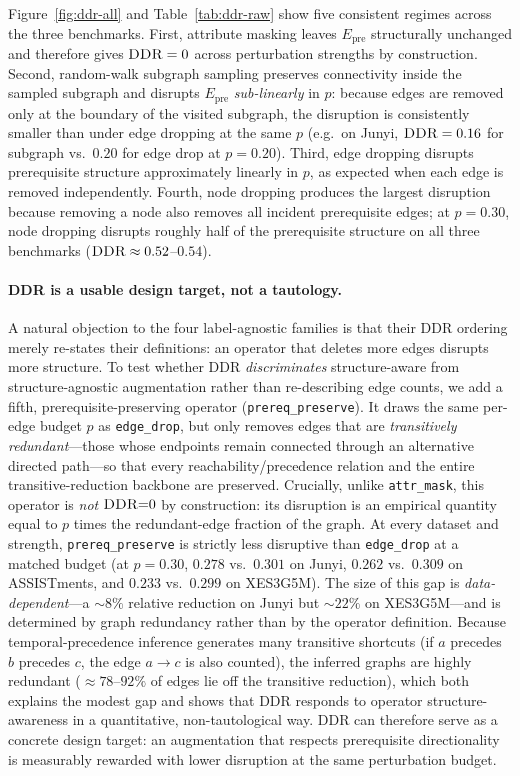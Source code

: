 \documentclass[pdflatex,sn-basic]{sn-jnl}
\newcommand{\Epre}{\ensuremath{E_{\text{pre}}}}
\newcommand{\DDR}{\textsc{DDR}}
\begin{document}
Figure~\ref{fig:ddr-all} and Table~\ref{tab:ddr-raw} show five
consistent regimes across the three benchmarks. First, attribute
masking leaves $\Epre$ structurally unchanged and therefore gives
$\DDR{}=0$ across perturbation strengths by construction. Second,
random-walk subgraph sampling preserves connectivity inside the
sampled subgraph and disrupts $\Epre$ \emph{sub-linearly} in $p$:
because edges are removed only at the boundary of the visited
subgraph, the disruption is consistently smaller than under
edge dropping at the same $p$ (e.g.\ on Junyi, $\DDR{} = 0.16$ for
subgraph vs.\ $0.20$ for edge drop at $p=0.20$). Third, edge dropping
disrupts prerequisite structure approximately linearly in $p$, as
expected when each edge is removed independently. Fourth, node
dropping produces the largest disruption because removing a node also
removes all incident prerequisite edges; at $p = 0.30$, node dropping
disrupts roughly half of the prerequisite structure on all three
benchmarks ($\DDR{} \approx 0.52$--$0.54$).

\paragraph{\DDR{} is a usable design target, not a tautology.}
A natural objection to the four label-agnostic families is that their
\DDR{} ordering merely re-states their definitions: an operator that
deletes more edges disrupts more structure. To test whether \DDR{}
\emph{discriminates} structure-aware from structure-agnostic
augmentation rather than re-describing edge counts, we add a fifth,
prerequisite-preserving operator (\texttt{prereq\_preserve}). It draws
the same per-edge budget $p$ as \texttt{edge\_drop}, but only removes
edges that are \emph{transitively redundant}---those whose endpoints
remain connected through an alternative directed path---so that every
reachability/precedence relation and the entire transitive-reduction
backbone are preserved. Crucially, unlike \texttt{attr\_mask}, this
operator is \emph{not} $\DDR{=}0$ by construction: its disruption is an
empirical quantity equal to $p$ times the redundant-edge fraction of the
graph. At every dataset and strength, \texttt{prereq\_preserve} is
strictly less disruptive than \texttt{edge\_drop} at a matched budget
(at $p=0.30$, $0.278$ vs.\ $0.301$ on Junyi, $0.262$ vs.\ $0.309$ on
ASSISTments, and $0.233$ vs.\ $0.299$ on XES3G5M). The size of this gap
is \emph{data-dependent}---a $\sim 8\%$ relative reduction on Junyi but
$\sim 22\%$ on XES3G5M---and is determined by graph redundancy rather
than by the operator definition. Because temporal-precedence inference
generates many transitive shortcuts (if $a$ precedes $b$ precedes $c$,
the edge $a\!\to\!c$ is also counted), the inferred graphs are
highly redundant ($\approx 78$--$92\%$ of edges lie off the transitive
reduction), which both explains the modest gap and shows that \DDR{}
responds to operator structure-awareness in a quantitative,
non-tautological way. \DDR{} can therefore serve as a concrete design
target: an augmentation that respects prerequisite directionality is
measurably rewarded with lower disruption at the same perturbation
budget.
\end{document}
